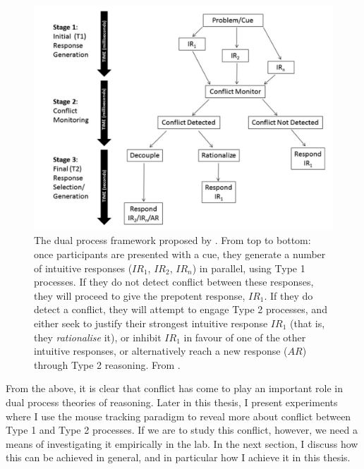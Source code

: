 \begin{figure}[ht]
  \centering
  \includegraphics[width=.7\textwidth]{imgs/pennycook.png}
  \caption[The dual process framework proposed by \citet{Pennycook2015}.]{
    The dual process framework proposed by \citet{Pennycook2015}.
    From top to bottom: once participants are presented with a cue,
    they generate a number of intuitive responses ($IR_1$,  $IR_2$, $IR_n$)
    in parallel, using Type 1 processes.
    If they do not detect conflict between these responses,
    they will proceed to give the prepotent response, $IR_1$.
    If they do detect a conflict,
    they will attempt to engage Type 2 processes,
    and either seek to justify their strongest intuitive response $IR_1$
    (that is, they \emph{rationalise} it),
    or inhibit $IR_1$ in favour of one of the other intuitive responses,
    or alternatively reach a new response ($AR$)
    through Type 2 reasoning.
    From \citet{Pennycook2015}.
    \label{fig:pennycook}
  }
\end{figure}

From the above, it is clear that
conflict has come to play an important role
in dual process theories of reasoning.
Later in this thesis, I present experiments
where I use the mouse tracking paradigm
to reveal more about conflict between
Type 1 and Type 2 processes.
If we are to study this conflict, however,
we need a means of investigating it empirically in the lab.
In the next section,
I discuss how this can be achieved in general,
and in particular how I achieve it in this thesis.


